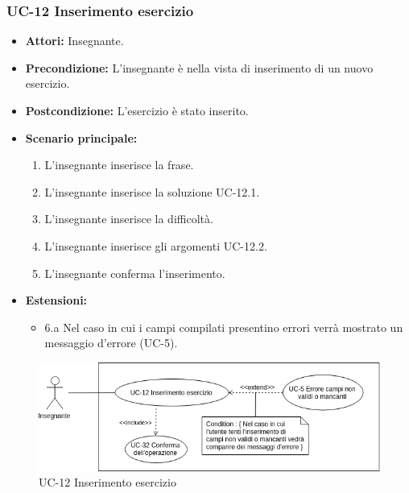 \subsubsection{UC-12 Inserimento esercizio}
	\begin{itemize}
		\item \textbf{Attori: }Insegnante.
		\item \textbf{Precondizione: }L'insegnante è nella vista di inserimento di un nuovo esercizio.
		\item \textbf{Postcondizione: }L'esercizio è stato inserito.
		\item \textbf{Scenario principale: }
		\begin{enumerate} 
		\item L'insegnante inserisce la frase.
		\item L'insegnante inserisce la soluzione UC-12.1.
		\item L'insegnante inserisce la difficoltà.
		\item L'insegnante inserisce gli argomenti UC-12.2.
		\item L'insegnante conferma l'inserimento.
		\end{enumerate}
		\item \textbf{Estensioni:} 
		\begin{itemize}
		\item 6.a Nel caso in cui i campi compilati presentino errori verrà mostrato un messaggio d'errore (UC-5).
		\end{itemize}
	\end{itemize}
	\begin{figure}[h]
	\centering
	\includegraphics[scale=0.7]{images/UC-12.png}
	\caption{UC-12 Inserimento esercizio}
\end{figure}

